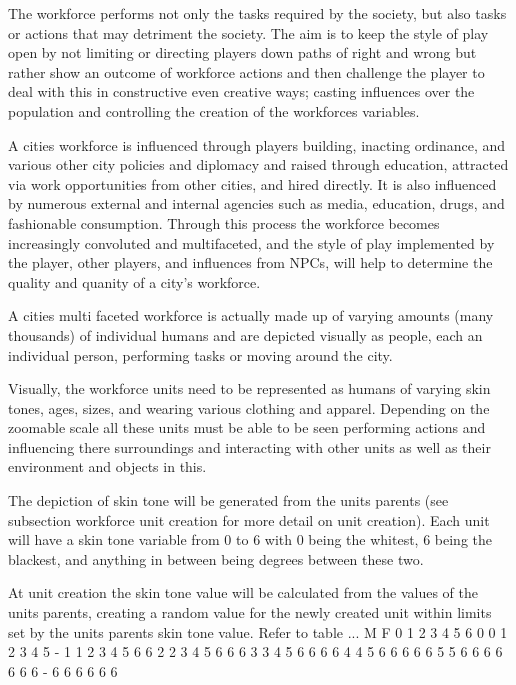 The workforce performs not only the tasks required by the society, but also tasks or actions that may detriment the society. The aim is to keep the style of play open by not limiting or directing players down paths of right and wrong but rather show an outcome of workforce actions and then challenge the player to deal with this in constructive even creative ways; casting influences over the population and controlling the creation of the workforces variables. 

A cities workforce is influenced through players building, inacting ordinance, and various other city policies and diplomacy and raised through education, attracted via work opportunities from other cities, and hired directly. It is also influenced by numerous external and internal agencies such as media, education, drugs, and fashionable consumption. Through this process the workforce becomes increasingly convoluted and multifaceted, and the style of play implemented by the player, other players, and influences from NPCs, will help to determine the quality and quanity of a city's workforce. 

A cities multi faceted workforce is actually made up of varying amounts (many thousands) of individual humans and are depicted visually as people, each an individual person, performing tasks or moving around the city.  

Visually, the workforce units need to be represented as humans of varying skin tones, ages, sizes, and wearing various clothing and apparel. Depending on the zoomable scale all these units must be able to be seen performing actions and influencing there surroundings and interacting with other units as well as their environment and objects in this. 

The depiction of skin tone will be generated from the units parents (see subsection workforce unit creation for more detail on unit creation). 
Each unit will have a skin tone variable from 0 to 6 with 0 being the whitest, 6 being the blackest, and anything in between being degrees between these two. 

At unit creation the skin tone value will be calculated from the values of the units parents, creating a random value for the newly created unit within limits set by the units parents skin tone value. Refer to table ... 
   M 
F  0 1 2 3 4 5 6
0  0 1 2 3 4 5 - 
1  1 2 3 4 5 6 6
2  2 3 4 5 6 6 6
3  3 4 5 6 6 6 6
4  4 5 6 6 6 6 6
5  5 6 6 6 6 6 6
6  - 6 6 6 6 6 6 

